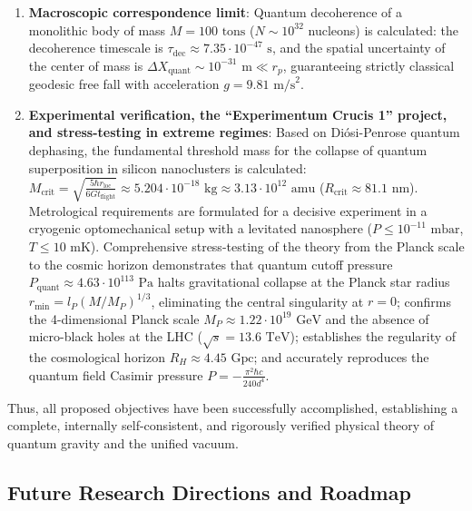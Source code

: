 \documentclass[11pt,a4paper]{article}
\theoremstyle{definition}
\begin{document}
\begin{enumerate}
\item \textbf{Macroscopic correspondence limit}: Quantum decoherence of a monolithic body of mass $M = 100\text{ tons}$ ($N \sim 10^{32}$ nucleons) is calculated: the decoherence timescale is $\tau_{\text{dec}} \approx 7.35 \cdot 10^{-47}\text{ s}$, and the spatial uncertainty of the center of mass is $\Delta X_{\text{quant}} \sim 10^{-31}\text{ m} \ll r_p$, guaranteeing strictly classical geodesic free fall with acceleration $g = 9.81\text{ m/s}^2$.

\item \textbf{Experimental verification, the ``Experimentum Crucis 1'' project, and stress-testing in extreme regimes}: Based on Diósi-Penrose quantum dephasing, the fundamental threshold mass for the collapse of quantum superposition in silicon nanoclusters is calculated: $M_{\text{crit}} = \sqrt{\frac{5\hbar r_{\text{loc}}}{6 G t_{\text{flight}}}} \approx 5.204 \cdot 10^{-18}\text{ kg} \approx 3.13 \cdot 10^{12}\text{ amu}$ ($R_{\text{crit}} \approx 81.1\text{ nm}$). Metrological requirements are formulated for a decisive experiment in a cryogenic optomechanical setup with a levitated nanosphere ($P \le 10^{-11}\text{ mbar}$, $T \le 10\text{ mK}$). Comprehensive stress-testing of the theory from the Planck scale to the cosmic horizon demonstrates that quantum cutoff pressure $P_{\text{quant}} \approx 4.63 \cdot 10^{113}\text{ Pa}$ halts gravitational collapse at the Planck star radius $r_{\min} = l_P (M/M_P)^{1/3}$, eliminating the central singularity at $r=0$; confirms the 4-dimensional Planck scale $M_P \approx 1.22 \cdot 10^{19}\text{ GeV}$ and the absence of micro-black holes at the LHC ($\sqrt{s} = 13.6\text{ TeV}$); establishes the regularity of the cosmological horizon $R_H \approx 4.45\text{ Gpc}$; and accurately reproduces the quantum field Casimir pressure $P = - \frac{\pi^2 \hbar c}{240 d^4}$.
\end{enumerate}

Thus, all proposed objectives have been successfully accomplished, establishing a complete, internally self-consistent, and rigorously verified physical theory of quantum gravity and the unified vacuum.

\subsection{Future Research Directions and Roadmap}\label{subsec:roadmap}
\end{document}
